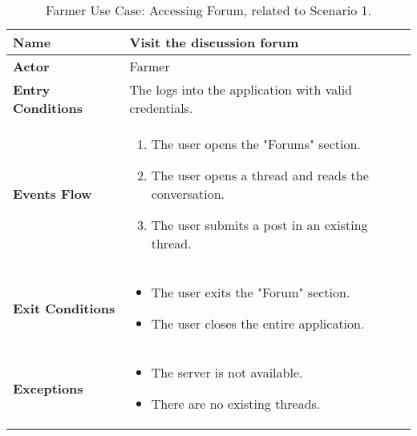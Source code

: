 \begin{table}[hbt!]
\centering
\small
\caption{\label{tab:farmerViewForum}Farmer Use Case: Accessing Forum, related to Scenario 1.}
\renewcommand{\arraystretch}{1.25}
\begin{tabular}{|l|>{\raggedright\arraybackslash}m{12cm}|}

    \hline
    \textbf{Name} & Visit the discussion forum\\
    \hline
   	\textbf{Actor} & Farmer\\
    \hline
    \textbf{Entry Conditions} & The logs into the application with valid credentials.\\
    \hline
    \textbf{Events Flow} & 
    		\begin{enumerate}
    			\item The user opens the "Forums" section.
    			\item The user opens a thread and reads the conversation.
    			\item The user submits a post in an existing thread.
    		\end{enumerate}
    	\\
    \hline
    \textbf{Exit Conditions} & \begin{itemize}
    	\item The user exits the "Forum" section.
    	\item The user closes the entire application.\end{itemize}\\
    \hline
    \textbf{Exceptions} & 
    		\begin{itemize}
    			\item The server is not available.
    			\item There are no existing threads.
    		\end{itemize}
    	\\
    \hline
\end{tabular}
\end{table}